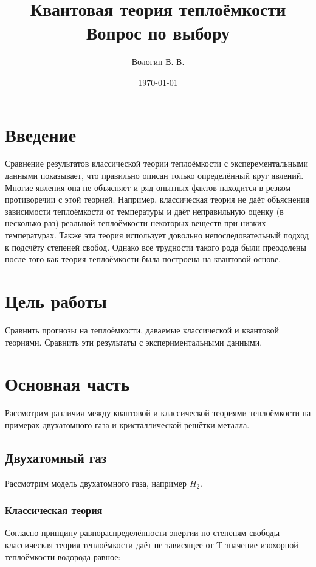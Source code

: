 \documentclass[a4paper, 12pt]{article}
\author{Вологин В. В.}
\title{Квантовая теория теплоёмкости \\ Вопрос по выбору}
\date{\today}
\begin{document}
\maketitle
\newpage

\tableofcontents{}
\newpage

\section{Введение}

Сравнение результатов классической теории теплоёмкости с эксперементальными данными показывает, что
правильно описан только определённый круг явлений. Многие явления она не объясняет
и ряд опытных фактов находится в резком противоречии с этой теорией. Например, классическая
теория не даёт объяснения зависимости теплоёмкости от температуры и даёт неправильную оценку (в
несколько раз) реальной теплоёмкости некоторых веществ при низких температурах. Также эта теория
использует довольно непоследовательный подход к подсчёту степеней свобод. Однако все трудности
такого рода были преодолены после того как теория теплоёмкости была построена на квантовой основе.


\section{Цель работы}
Сравнить прогнозы на теплоёмкости, даваемые классической и квантовой теориями. Сравнить эти
результаты с экспериментальными данными.



\section{Основная часть}
Рассмотрим различия между квантовой и классической теориями теплоёмкости на примерах двухатомного газа и кристаллической решётки металла.



\subsection{Двухатомный газ}
Рассмотрим модель двухатомного газа, например $H_2$.

\subsubsection{Классическая теория}

Согласно принципу равнораспределённости энергии по степеням свободы классическая теория теплоёмкости даёт не зависящее от T значение изохорной теплоёмкости водорода равное:
\end{document}
